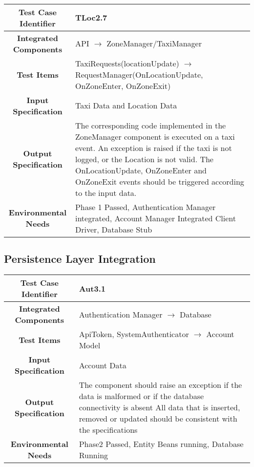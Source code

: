 \documentclass[11pt, a4paper,titlepage]{article}
\begin{document}
	 \subsubsection{}
	 \begin{tabularx}{\textwidth}{| c|X|}
	 	\hline \textbf{Test Case Identifier} & \label{TLoc2.7}TLoc2.7\\
	 	\hline \textbf{Integrated Components} & API  $\rightarrow $  ZoneManager/TaxiManager \\
	 	\hline \textbf{Test Items} & TaxiRequests(locationUpdate) $\rightarrow $ RequestManager(OnLocationUpdate, OnZoneEnter, OnZoneExit) \\
	 	\hline \textbf{Input Specification} & Taxi Data and Location Data \\
	 	\hline \textbf{Output Specification} & The corresponding code implemented in the ZoneManager component is executed on a taxi event. 
	 	\newline An exception is raised if the taxi is not logged, or the Location is not valid. \newline
	 	The OnLocationUpdate, OnZoneEnter and OnZoneExit events should be triggered according to the input data. \\
	 	\hline \textbf{Environmental Needs} &  Phase 1 Passed, Authentication Manager integrated, Account Manager Integrated \newline 
	 	Client Driver, Database Stub\\
	 	\hline
	 \end{tabularx}
	 \newline
	 	
	\subsection{Persistence Layer Integration}
	
		\begin{tabularx}{\textwidth}{| c|X|}
			\hline \textbf{Test Case Identifier} & \label{Aut3.1}Aut3.1 \\
			\hline \textbf{Integrated Components} & Authentication Manager $\rightarrow $ Database \\
			\hline \textbf{Test Items} & ApiToken, SystemAuthenticator $\rightarrow $ Account Model \\
			\hline \textbf{Input Specification} & Account Data \\
			\hline \textbf{Output Specification} & The component should raise an exception if the data is malformed or if the database connectivity is absent \newline
			All data that is inserted, removed or updated should be consistent with the specifications\\
			\hline \textbf{Environmental Needs} & Phase2 Passed, Entity Beans running, Database Running \\
			\hline
		\end{tabularx}
		\newline
\end{document}
